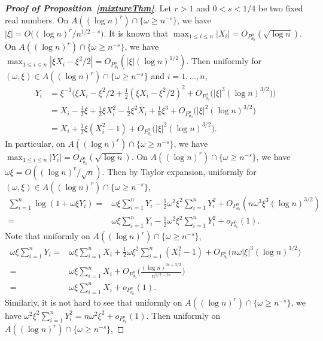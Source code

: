 \documentclass[11pt]{article}
\theoremstyle{plain}
\theoremstyle{definition}
\theoremstyle{remark}
\begin{document}
\begin{appendices}
\begin{proof}[\textbf{Proof of Proposition~\ref{mixtureThm}}]
Let $r>1$ and $ 0 < s< 1/4$ be two fixed real numbers.
On $A((\log n)^r)\cap \{\omega\geq n^{-s}\}$,
we have $|\xi| = O\big((\log n)^{r}/n^{1/2-s}\big)$.
It is known that $\max_{1\leq i \leq n}|X_i|=O_{P_{\theta_0}^n}(\sqrt{\log n})$.
On $A((\log n)^r)\cap \{\omega\geq n^{-s}\}$, we have $\max_{1\leq i\leq n}|\xi X_i-\xi^2/2|= O_{P_{\theta_0}^n} (|\xi|(\log n)^{1/2})$.
Then uniformly for $ (\omega, \xi) \in A((\log n)^r)\cap \{\omega\geq n^{-s}\}$ and $i=1,\ldots, n$, 
\begin{align*}
Y_i&=\xi^{-1}\Big(\xi X_i-\xi^2/2 +\frac{1}{2}(\xi X_i-\xi^2/2)^2+O_{P^n_{\theta_0}} \big(|\xi|^3 (\log n)^{3/2}\big)\Big) 
    \\
    &=X_i-\frac{1}{2}\xi+\frac{1}{2} \xi X_i^2-\frac{1}{2} \xi^2 X_i +\frac{1}{8}\xi^3+O_{P^n_{\theta_0}} \big(|\xi|^2 (\log n)^{3/2}\big)
    \\
    &=X_i+\frac{1}{2} \xi (X_i^2-1) + O_{P^n_{\theta_0}} \big(|\xi|^2 (\log n)^{3/2}\big).
\end{align*}
In particular, on $A((\log n)^r)\cap \{\omega\geq n^{-s}\}$, we have $\max_{1\leq i \leq n}|Y_i|=O_{P^n_{\theta_0}}(\sqrt{\log n})$.
On $A((\log n)^r)\cap \{\omega\geq n^{-s}\}$, we have $\omega \xi =O((\log n)^r /\sqrt{n})$.
Then by Taylor expansion, uniformly for $ (\omega, \xi) \in A((\log n)^r)\cap \{\omega\geq n^{-s}\}$,
\begin{align*}
    \sum_{i=1}^n \log(1+\omega \xi Y_i)
    =& \omega \xi\sum_{i=1}^n Y_i -\frac{1}{2} \omega^2 \xi^2 \sum_{i=1}^n Y_i^2+O_{P^n_{\theta_0}}(n\omega^3 \xi^3 (\log n)^{3/2})
    \\
    =& \omega \xi\sum_{i=1}^n Y_i -\frac{1}{2} \omega^2 \xi^2 \sum_{i=1}^n Y_i^2+o_{P^n_{\theta_0}}(1).
\end{align*}
Note that uniformly on $ A((\log n)^r)\cap \{\omega\geq n^{-s}\}$,
\begin{align*}
    \omega \xi\sum_{i=1}^n Y_i
    =&
    \omega \xi\sum_{i=1}^n 
    X_i+\frac{1}{2} \omega \xi^2\sum_{i=1}^n (X_i^2-1) + O_{P^n_{\theta_0}} \big(n\omega |\xi|^3 (\log n)^{3/2}\big)
    \\
    =&
    \omega \xi\sum_{i=1}^n X_i + O_{P^n_{\theta_0}}\Big( \frac{(\log n)^{3r+3/2}}{n^{1/2-2s}}\Big)
    \\
=&
\omega \xi\sum_{i=1}^n X_i + o_{P^n_{\theta_0}}(1).
\end{align*}
Similarly, it is not hard to see that uniformly on $ A((\log n)^r)\cap \{\omega\geq n^{-s}\}$, we have
$\omega^2 \xi^2 \sum_{i=1}^n Y_i^2=n\omega^2 \xi^2 +o_{P^n_{\theta_0}}(1)$.
Then uniformly on $A((\log n)^r)\cap \{\omega\geq n^{-s}\}$,

\end{proof}
\end{appendices}
\end{document}
